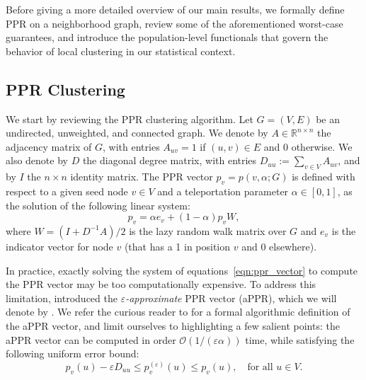 \documentclass[twoside,11pt]{article}
\newcommand{\Reals}{\mathbb{R}}
\newcommand{\1}{\mathbf{1}}
\newcommand{\mc}[1]{\mathcal{#1}}
\begin{document}
Before giving a more detailed overview of our main results, we formally define PPR on a neighborhood graph, review some of the aforementioned worst-case guarantees, and introduce the population-level functionals that govern the behavior of local clustering in our statistical context. 

\subsection{PPR Clustering}
\label{subsec:ppr_clustering}
We start by reviewing the PPR clustering algorithm. Let $G = (V,E)$ be an undirected, unweighted, and connected graph. We denote by $A \in \Reals^{n \times n}$ the adjacency matrix of $G$, with entries $A_{uv} = 1$ if $(u,v) \in E$ and $0$ otherwise.  We also denote by $D$ the diagonal degree matrix, with entries $D_{uu} := \sum_{v \in V} A_{uv}$, and by $I$ the $n \times n$ identity matrix. The PPR vector $p_v = p(v,\alpha;G)$ is defined with respect to a given seed node $v \in V$ and a teleportation parameter $\alpha \in [0,1]$, as the solution of the following linear system:
\begin{equation}
\label{eqn:ppr_vector}
p_v = \alpha e_{v} + (1 - \alpha) p_v W,
\end{equation}
where $W = (I + D^{-1}A)/2$ is the lazy random walk matrix over $G$ and $e_{v}$ is the indicator vector for node $v$ (that has a 1 in position $v$ and 0 elsewhere). 

In practice, exactly solving the system of equations~\eqref{eqn:ppr_vector} to compute the PPR vector may be too computationally expensive. To address this limitation, \citet{andersen2006} introduced the \emph{$\varepsilon$-approximate} PPR vector (aPPR), which we will denote by . We refer the curious reader to \citet{andersen2006} for a formal algorithmic definition of the aPPR vector, and limit ourselves to highlighting a few salient points: the aPPR vector can be computed in order $\mc{O}(1/(\varepsilon\alpha))$ time, while satisfying the following uniform error bound: 
\begin{equation}
\label{eqn:appr_error}
p_v(u) - \varepsilon D_{uu}\leq p_v^{(\varepsilon)}(u) \leq p_v(u), 
\quad \text{for all $u \in V$}.
\end{equation}
\end{document}
